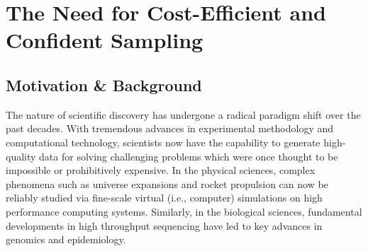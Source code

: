 \documentclass[11pt]{NSFamsart}
\newcommand{\cmtS}[1]{{\color{blue}{(Simon: #1)}}}
\begin{document}




\section{The Need for Cost-Efficient and Confident Sampling}

\subsection{Motivation \& Background} The nature of scientific discovery has undergone a radical paradigm shift over the past decades. With tremendous advances in experimental methodology and computational technology, scientists now have the capability to generate high-quality data for solving challenging problems which were once thought to be impossible or prohibitively expensive. In the physical sciences, complex phenomena such as universe expansions \citep{kaufman2011efficient} and rocket propulsion \citep{mak2018efficient,yeh2018common} can now be reliably studied via fine-scale virtual (i.e., computer) simulations on high performance computing systems. Similarly, in the biological sciences, fundamental developments in high throughput sequencing have led to key advances in genomics and epidemiology.
\end{document}

